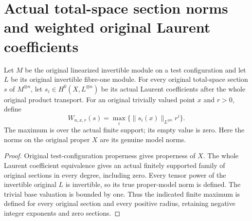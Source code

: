 \section{Actual total-space section norms and weighted original Laurent coefficients}

\begin{definition}\label{def:native-tc-weighted-laurent-section-norm}
\leanok
Let $M$ be the original linearized invertible module on a test
configuration and let $L$ be its original invertible fibre-one module.
For every original total-space section $s$ of $M^{\otimes n}$, let
$s_i\in H^0(X,L^{\otimes n})$ be its actual Laurent coefficients
after the whole original product transport. For an original trivially
valued point $x$ and $r>0$, define
\[
 W_{n,x,r}(s)=\max_i\{\lVert s_i(x)\rVert_{L^{\otimes n}}r^i\}.
\]
The maximum is over the actual finite support; its empty value is zero.
Here the norms on the original proper $X$ are its genuine model norms.
\end{definition}
\begin{proof}
Original test-configuration properness gives properness of $X$.
The whole Laurent coefficient equivalence gives an actual finitely
supported family of original sections in every degree, including zero.
Every tensor power of the invertible original $L$ is invertible,
so its true proper-model norm is defined. The trivial base valuation
is bounded by one. Thus the indicated finite maximum is defined for
every original section and every positive radius, retaining negative
integer exponents and zero sections.
\end{proof}

